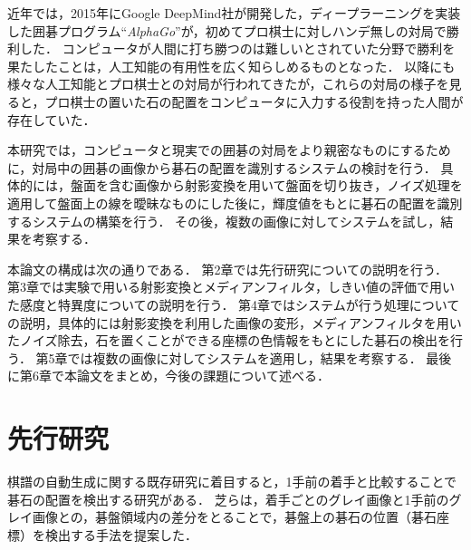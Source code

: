 \documentclass[openright]{nitocs}
\numberwithin{equation}{section}
\begin{document}
        近年では，2015年にGoogle DeepMind社が開発した，ディープラーニングを実装した囲碁プログラム``{\it AlphaGo}''\cite{AlphaGo}が，初めてプロ棋士に対しハンデ無しの対局で勝利した．
        コンピュータが人間に打ち勝つのは難しいとされていた分野で勝利を果たしたことは，人工知能の有用性を広く知らしめるものとなった．
        以降にも様々な人工知能とプロ棋士との対局が行われてきたが，これらの対局の様子を見ると，プロ棋士の置いた石の配置をコンピュータに入力する役割を持った人間が存在していた．

        本研究では，コンピュータと現実での囲碁の対局をより親密なものにするために，対局中の囲碁の画像から碁石の配置を識別するシステムの検討を行う．
        具体的には，盤面を含む画像から射影変換を用いて盤面を切り抜き，ノイズ処理を適用して盤面上の線を曖昧なものにした後に，輝度値をもとに碁石の配置を識別するシステムの構築を行う．
        その後，複数の画像に対してシステムを試し，結果を考察する．

        本論文の構成は次の通りである．
        第2章では先行研究についての説明を行う．
        第3章では実験で用いる射影変換とメディアンフィルタ，しきい値の評価で用いた感度と特異度についての説明を行う．
        第4章ではシステムが行う処理についての説明，具体的には射影変換を利用した画像の変形，メディアンフィルタを用いたノイズ除去，石を置くことができる座標の色情報をもとにした碁石の検出を行う．
        第5章では複数の画像に対してシステムを適用し，結果を考察する．
        最後に第6章で本論文をまとめ，今後の課題について述べる．

    \section{先行研究} %
        棋譜の自動生成に関する既存研究に着目すると，1手前の着手と比較することで碁石の配置を検出する研究がある．
        芝らは，着手ごとのグレイ画像と1手前のグレイ画像との，碁盤領域内の差分をとることで，碁盤上の碁石の位置（碁石座標）を検出する手法を提案した\cite{PilotStudy}．
        
\end{document}
